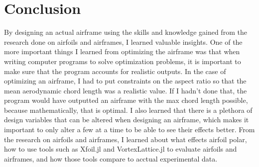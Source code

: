 \documentclass{journal}
\begin{document}
	\section{Conclusion}
	By designing an actual airframe using the skills and knowledge gained from the research done on airfoils and airframes, I learned valuable insights. One of the more important things I learned from optimizing the airframe was that when writing computer programs to solve optimization problems, it is important to make sure that the program accounts for realistic outputs. In the case of optimizing an airframe, I had to put constraints on the aspect ratio so that the mean aerodynamic chord length was a realistic value. If I hadn't done that, the program would have outputted an airframe with the max chord length possible, because mathematically, that is optimal. I also learned that there is a plethora of design variables that can be altered when designing an airframe, which makes it important to only alter a few at a time to be able to see their effects better. From the research on airfoils and airframes, I learned about what effects airfoil polar, how to use tools such as Xfoil.jl \cite{McDonnell} and VortexLattice.jl \cite{McDonnell-Ning} to evaluate airfoils and airframes, and how those tools compare to acctual experimental data.\\
	
	\printbibliography
	
\end{document}
